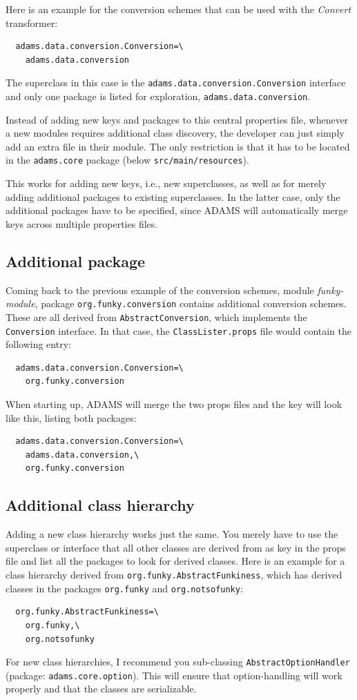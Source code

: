 Here is an example for the conversion schemes that can be used with the
\textit{Convert} transformer:
\begin{verbatim}
  adams.data.conversion.Conversion=\
    adams.data.conversion
\end{verbatim}
The superclass in this case is the
\texttt{adams.data.conversion.Conversion} interface and only one package is listed
for exploration, \texttt{adams.data.conversion}.

Instead of adding new keys and packages to this central properties file,
whenever a new modules requires additional class discovery, the developer can
just simply add an extra file in their module. The only restriction is that it
has to be located in the \texttt{adams.core} package (below
\texttt{src/main/resources}).

This works for adding new keys, i.e., new superclasses, as well as for merely
adding additional packages to existing superclasses. In the latter case, only
the additional packages have to be specified, since ADAMS will automatically
merge keys across multiple properties files.

\subsection{Additional package}
Coming back to the previous example of the conversion schemes, module
\textit{funky-module}, package \texttt{org.funky.conversion} contains
additional conversion schemes. These are all derived from
\texttt{AbstractConversion}, which implements the \texttt{Conversion} interface.
In that case, the \texttt{ClassLister.props} file would contain the following entry:
\begin{verbatim}
  adams.data.conversion.Conversion=\
    org.funky.conversion
\end{verbatim}
When starting up, ADAMS will merge the two props files and the key
will look like this, listing both packages:
\begin{verbatim}
  adams.data.conversion.Conversion=\
    adams.data.conversion,\
    org.funky.conversion
\end{verbatim}

\subsection{Additional class hierarchy}
Adding a new class hierarchy works just the same. You merely have to use the
superclass or interface that all other classes are derived from as key in the props file and
list all the packages to look for derived classes. Here is an example for a
class hierarchy derived from \texttt{org.funky.AbstractFunkiness}, which has
derived classes in the packages \texttt{org.funky} and \texttt{org.notsofunky}:
\begin{verbatim}
  org.funky.AbstractFunkiness=\
    org.funky,\
    org.notsofunky
\end{verbatim}
For new class hierarchies, I recommend you sub-classing \texttt{AbstractOptionHandler}
(package: \texttt{adams.core.option}). This will ensure that option-handling
will work properly and that the classes are serializable.

